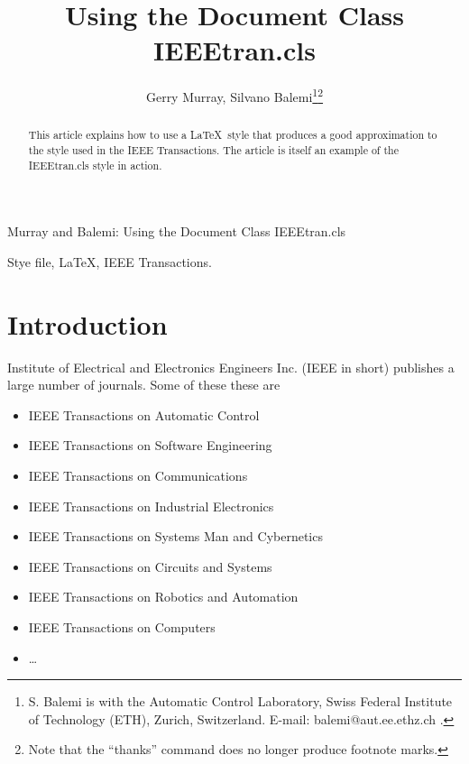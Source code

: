 \documentclass[twocolumn]{IEEEtran} %
\begin{document}
\title{Using the Document Class IEEEtran.cls} %

\author{Gerry Murray, Silvano Balemi\thanks{S. Balemi is with the
Automatic Control Laboratory, Swiss Federal Institute of Technology
(ETH), Zurich, Switzerland. E-mail: balemi@aut.ee.ethz.ch .}\thanks{Note
that the ``thanks'' command does no longer produce footnote marks.}}

{Murray and Balemi: Using the Document Class IEEEtran.cls} %


\maketitle

\begin{abstract}
This article explains how to use a \LaTeX\ style that produces a good
approximation to the style used in the IEEE Transactions.  The article
is itself an example of the IEEEtran.cls style in action.
\end{abstract}

\begin{keywords}
Stye file, \LaTeX, IEEE Transactions.
\end{keywords}

\section{Introduction}
 Institute of Electrical and Electronics Engineers
Inc. (IEEE in short) publishes a large number of journals.  Some of
these these are

\begin{itemize}
\item IEEE Transactions on Automatic Control
\item IEEE Transactions on Software Engineering
\item IEEE Transactions on Communications
\item IEEE Transactions on Industrial Electronics
\item IEEE Transactions on Systems Man and Cybernetics
\item IEEE Transactions on Circuits and Systems
\item IEEE Transactions on Robotics and Automation
\item IEEE Transactions on Computers
\item \ldots{}
\end{itemize}
\end{document}
